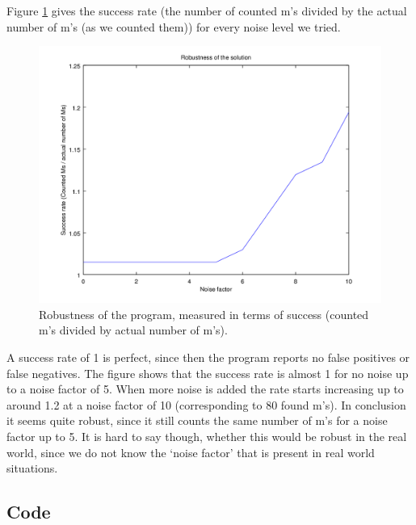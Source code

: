 \documentclass{article}
\begin{document}
Figure \ref{fig3b} gives the success rate (the number of counted m's divided by the actual number of m's (as we counted them)) for every noise level we tried.
\begin{figure}[H]
 \centering
 \includegraphics[width=.7\textwidth]{fig3.png}
 \caption{Robustness of the program, measured in terms of success (counted m's divided by actual number of m's).}
 \label{fig3b}
\end{figure}
A success rate of 1 is perfect, since then the program reports no false positives or false negatives. The figure shows that the success rate is almost 1 for no noise up to a noise factor of 5. When more noise is added the rate starts increasing up to around 1.2 at a noise factor of 10 (corresponding to 80 found m's). In conclusion it seems quite robust, since it still counts the same number of m's for a noise factor up to 5. It is hard to say though, whether this would be robust in the real world, since we do not know the `noise factor' that is present in real world situations. 

\begin{appendices}
\section{Code}
 
 
 
 
 
 
 
 
\end{appendices}
\end{document}
